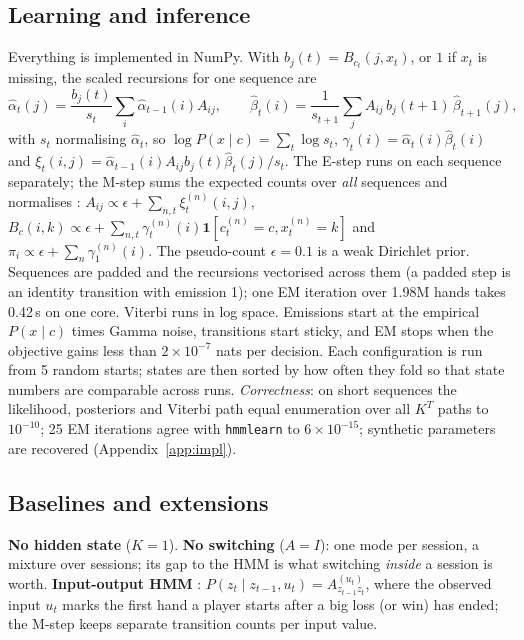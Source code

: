 \documentclass{article}
\begin{document}
\subsection{Learning and inference}
Everything is implemented in NumPy. With $b_j(t)=B_{c_t}(j,x_t)$, or $1$ if $x_t$ is missing, the scaled recursions for one sequence are
\begin{equation}
\hat\alpha_t(j)=\frac{b_j(t)}{s_t}\sum_i\hat\alpha_{t-1}(i)A_{ij},\qquad
\hat\beta_t(i)=\frac{1}{s_{t+1}}\sum_jA_{ij}\,b_j(t+1)\,\hat\beta_{t+1}(j),
\end{equation}
with $s_t$ normalising $\hat\alpha_t$, so $\log P(x\mid c)=\sum_t\log s_t$, $\gamma_t(i)=\hat\alpha_t(i)\hat\beta_t(i)$ and $\xi_t(i,j)=\hat\alpha_{t-1}(i)A_{ij}b_j(t)\hat\beta_t(j)/s_t$. The E-step runs on each sequence separately; the M-step sums the expected counts over \emph{all} sequences and normalises \cite{rabiner1989}: $A_{ij}\propto\epsilon+\sum_{n,t}\xi^{(n)}_t(i,j)$, $B_c(i,k)\propto\epsilon+\sum_{n,t}\gamma^{(n)}_t(i)\mathbf 1[c^{(n)}_t=c,x^{(n)}_t=k]$ and $\pi_i\propto\epsilon+\sum_n\gamma^{(n)}_1(i)$.
The pseudo-count $\epsilon=0.1$ is a weak Dirichlet prior. Sequences are padded and the recursions vectorised across them (a padded step is an identity transition with emission 1); one EM iteration over 1.98M hands takes 0.42\,s on one core. Viterbi runs in log space. Emissions start at the empirical $P(x\mid c)$ times Gamma noise, transitions start sticky, and EM stops when the objective gains less than $2\times10^{-7}$ nats per decision. Each configuration is run from 5 random starts; states are then sorted by how often they fold so that state numbers are comparable across runs. \emph{Correctness}: on short sequences the likelihood, posteriors and Viterbi path equal enumeration over all $K^T$ paths to $10^{-10}$; 25 EM iterations agree with \texttt{hmmlearn} \cite{hmmlearn} to $6\times10^{-15}$; synthetic parameters are recovered (Appendix~\ref{app:impl}).

\subsection{Baselines and extensions}
\label{sec:personal}
\textbf{No hidden state} ($K=1$). \textbf{No switching} ($A=I$): one mode per session, a mixture over sessions; its gap to the HMM is what switching \emph{inside} a session is worth. \textbf{Input-output HMM} \cite{bengio1995}: $P(z_t\mid z_{t-1},u_t)=A^{(u_t)}_{z_{t-1}z_t}$, where the observed input $u_t$ marks the first hand a player starts after a big loss (or win) has ended; the M-step keeps separate transition counts per input value.
\end{document}
